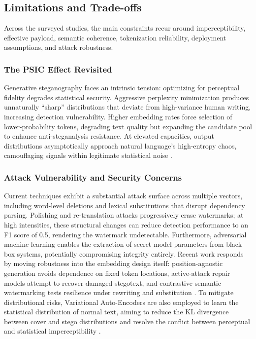 \subsection{Limitations and Trade-offs}
\label{sec:related-rq5}

Across the surveyed studies, the main constraints recur around imperceptibility, effective payload, semantic coherence, tokenization reliability, deployment assumptions, and attack robustness.

\subsubsection{The PSIC Effect Revisited}

Generative steganography faces an intrinsic tension: optimizing for perceptual fidelity degrades statistical security. Aggressive perplexity minimization produces unnaturally ``sharp'' distributions that deviate from high-variance human writing, increasing detection vulnerability. Higher embedding rates force selection of lower-probability tokens, degrading text quality but expanding the candidate pool to enhance anti-steganalysis resistance. At elevated capacities, output distributions asymptotically approach natural language's high-entropy chaos, camouflaging signals within legitimate statistical noise \cite{yang2020vae}.

\subsubsection{Attack Vulnerability and Security Concerns}

Current techniques exhibit a substantial attack surface across multiple vectors, including word-level deletions and lexical substitutions that disrupt dependency parsing. Polishing and re-translation attacks progressively erase watermarks; at high intensities, these structural changes can reduce detection performance to an F1 score of 0.5, rendering the watermark undetectable. Furthermore, adversarial machine learning enables the extraction of secret model parameters from black-box systems, potentially compromising integrity entirely. Recent work responds by moving robustness into the embedding design itself: position-agnostic generation avoids dependence on fixed token locations, active-attack repair models attempt to recover damaged stegotext, and contrastive semantic watermarking tests resilience under rewriting and substitution \cite{lin2025positionagnostic,chen2025activetwo,wang2025contrastive}. To mitigate distributional risks, Variational Auto-Encoders are also employed to learn the statistical distribution of normal text, aiming to reduce the KL divergence between cover and stego distributions and resolve the conflict between perceptual and statistical imperceptibility \cite{hao2025robust}.

